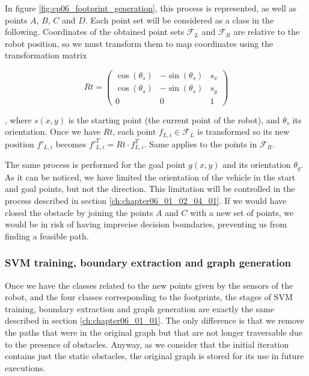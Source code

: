 In figure \ref{fig:cp06_footprint_generation}, this process is represented, as well as points $A$, $B$, $C$ and $D$. Each point set will be considered as a class in the following. Coordinates of the obtained point sets $\mathcal{F}_L$ and $\mathcal{F}_R$ are relative to the robot position, so we must transform them to map coordinates using the transformation matrix

\begin{equation}\label{eq:cp06_Rt_footprint}
 Rt = \left ( \begin{array}{ ccc }
  \cos(\theta_s) & -\sin(\theta_s) & s_x \\
  \cos(\theta_s) & -\sin(\theta_s) & s_y \\
  0 & 0 & 1
 \end{array} \right )
\end{equation}

, where $s(x,y)$ is the starting point (the current point of the robot), and $\theta_s$ its orientation. Once we have $Rt$, each point $f_{L,i} \in \mathcal{F}_L$ is transformed so its new position $f'_{L,i}$ becomes ${f'}_{L,i}^T = Rt \cdot f_{L,i}^T$. Same applies to the points in $\mathcal{F}_R$.

The same process is performed for the goal point $g(x,y)$ and its orientation $\theta_g$. As it can be noticed, we have limited the orientation of the vehicle in the start and goal points, but not the direction. This limitation will be controlled in the process described in section \ref{ch:chapter06_01_02_04_01}. If we would have closed the obstacle by joining the points $A$ and $C$ with a new set of points, we would be in  risk of having imprecise decision boundaries, preventing us from finding a feasible path.

\subsubsection{\ac{SVM} training, boundary extraction and graph generation}\label{ch:chapter06_01_02_03}

Once we have the classes related to the new points given by the sensors of the robot, and the four classes corresponding to the footprints, the stages of \ac{SVM} training, boundary extraction and graph generation are exactly the same described in section \ref{ch:chapter06_01_01}. The only difference is that we remove the paths that were in the original graph but that are not longer traversable due to the presence of obstacles. Anyway, as we consider that the initial iteration contains just the static obstacles, the original graph is stored for its use in future executions.


